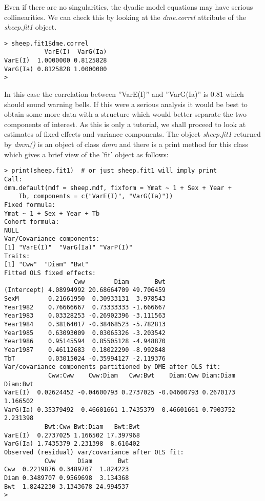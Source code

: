\documentclass[titlepage]{article}  %
\begin{document}
Even if there are no singularities, the dyadic model equations may have serious collinearities. We can check this by looking at the {\em dme.correl} attribute of the {\em sheep.fit1} object.

\begin{verbatim}
> sheep.fit1$dme.correl
           VarE(I)  VarG(Ia)
VarE(I)  1.0000000 0.8125828
VarG(Ia) 0.8125828 1.0000000
> 
\end{verbatim}
In this case the correlation between ''VarE(I)'' and ''VarG(Ia)'' is $0.81$ which should sound warning bells. If this were a serious analysis it would be best to obtain some more data with a structure which would better separate the two components of interest. As this is only a tutorial, we shall proceed to look at estimates of fixed effects and variance components. The object {\em sheep.fit1} returned by {\em dmm()} is an object of class {\em dmm} and there is a print method for this class which gives a brief view of the 'fit' object as follows:

\begin{verbatim}
> print(sheep.fit1)  # or just sheep.fit1 will imply print
Call:
dmm.default(mdf = sheep.mdf, fixform = Ymat ~ 1 + Sex + Year + 
    Tb, components = c("VarE(I)", "VarG(Ia)"))
Fixed formula:
Ymat ~ 1 + Sex + Year + Tb
Cohort formula:
NULL
Var/Covariance components:
[1] "VarE(I)"  "VarG(Ia)" "VarP(I)" 
Traits:
[1] "Cww"  "Diam" "Bwt" 
Fitted OLS fixed effects:
                   Cww        Diam       Bwt
(Intercept) 4.08994992 20.68664709 49.706459
SexM        0.21661950  0.30933131  3.978543
Year1982    0.76666667  0.73333333 -1.666667
Year1983    0.03328253 -0.26902396 -3.111563
Year1984    0.38164017 -0.38468523 -5.782813
Year1985    0.63093009  0.03065326 -3.203542
Year1986    0.95145594  0.85505128 -4.948870
Year1987    0.46112683  0.18022290 -8.992848
TbT         0.03015024 -0.35994127 -2.119376
Var/covariance components partitioned by DME after OLS fit:
            Cww:Cww    Cww:Diam   Cww:Bwt    Diam:Cww Diam:Diam Diam:Bwt
VarE(I)  0.02624452 -0.04600793 0.2737025 -0.04600793 0.2670173 1.166502
VarG(Ia) 0.35379492  0.46601661 1.7435379  0.46601661 0.7903752 2.231398
           Bwt:Cww Bwt:Diam   Bwt:Bwt
VarE(I)  0.2737025 1.166502 17.397968
VarG(Ia) 1.7435379 2.231398  8.616402
Observed (residual) var/covariance after OLS fit:
           Cww      Diam       Bwt
Cww  0.2219876 0.3489707  1.824223
Diam 0.3489707 0.9569698  3.134368
Bwt  1.8242230 3.1343678 24.994537
> 
\end{verbatim}
\end{document}
